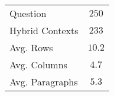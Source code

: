 \begin{tabular}{@{}lc@{}}
\toprule
Question       & $250$   \\
Hybrid Contexts & $233$   \\
Avg. Rows      & $10.2$  \\
Avg. Columns   & $4.7$   \\
Avg. Paragraphs & $5.3$   \\
\bottomrule
\end{tabular}